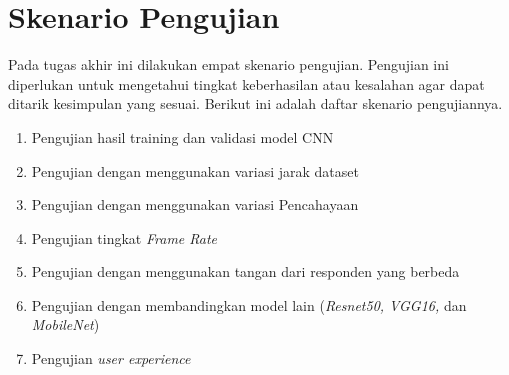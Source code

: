 

\section{Skenario Pengujian}
\label{sec:skenariopengujian}

Pada tugas akhir ini dilakukan empat skenario pengujian. Pengujian ini diperlukan untuk mengetahui tingkat keberhasilan atau kesalahan agar dapat ditarik kesimpulan yang sesuai. Berikut ini adalah daftar skenario pengujiannya.

\begin{enumerate}[nolistsep]

  \item Pengujian hasil training dan validasi model CNN
  \item Pengujian dengan menggunakan variasi jarak dataset
  \item Pengujian dengan menggunakan variasi Pencahayaan
  \item Pengujian tingkat \emph{Frame Rate}
  \item Pengujian dengan menggunakan tangan dari responden yang berbeda
  \item Pengujian dengan membandingkan model lain (\emph{Resnet50, VGG16,} dan \emph{MobileNet}) 
  \item Pengujian \emph{user experience}

\end{enumerate}

